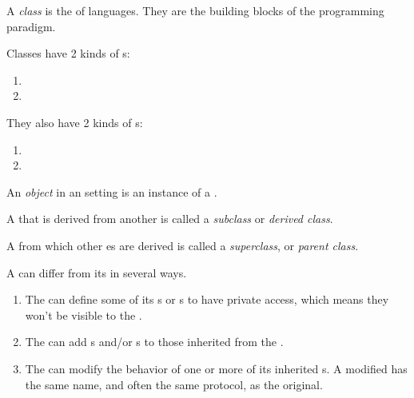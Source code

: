 \begin{definition}[Class]\label{def:OOP_Class}
  A \emph{class} is the  of  languages.
  They are the building blocks of the programming paradigm.

  Classes have 2 kinds of s:
  \begin{enumerate}[noitemsep]
  \item {}
  \item {}
  \end{enumerate}

  They also have 2 kinds of s:
  \begin{enumerate}[noitemsep]
  \item {}
  \item {}
  \end{enumerate}
\end{definition}

\begin{definition}[Object]\label{def:OOP_Object}
  An \emph{object} in an  setting is an instance of a .
\end{definition}

\begin{definition}[Subclass]\label{def:OOP_Subclass}
  A  that is derived from another  is called a \emph{subclass} or \emph{derived class}.
\end{definition}

\begin{definition}[Superclass]\label{def:OOP_Superclass}
  A  from which other es are derived is called a \emph{superclass}, or \emph{parent class}.
\end{definition}

A  can differ from its  in several ways.
\begin{enumerate}[noitemsep]
\item The  can define some of its s or s to have private access, which means they won't be visible to the .
\item The  can add s and/or s to those inherited from the .
\item The  can modify the behavior of one or more of its inherited s. A modified  has the same name, and often the same protocol, as the original.
\end{enumerate}

